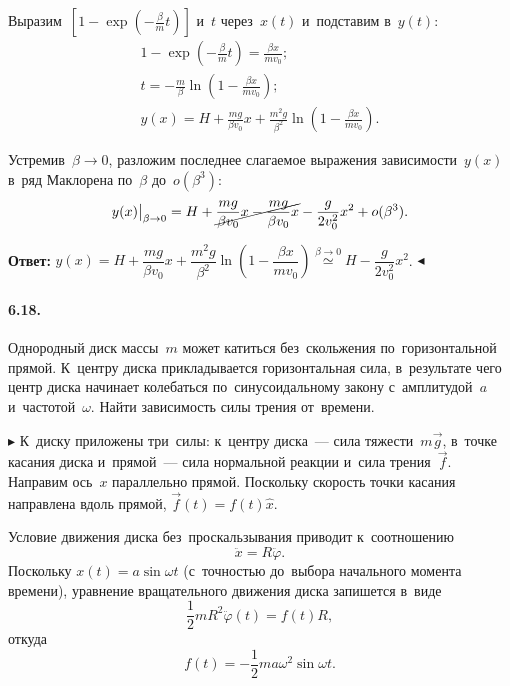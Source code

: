 \documentclass{weekly}
\begin{document}
Выразим~$\left[ 1 - \exp\left( -\frac{\beta}{m} t \right) \right]$
и~$t$ через~$x(t)$ и~подставим в~$y(t)$:
\begin{gather}
    1 - \exp\left( -\frac{\beta}{m} t \right)
        = \frac{\beta x}{m v_0}; \\
    t = -\frac{m}{\beta} \ln\left(1 - \frac{\beta x}{m v_0}\right); \\
    y(x) = H + \frac{mg}{\beta v_0} x +
            \frac{m^2 g}{\beta^2}
            \ln\left( 1 - \frac{\beta x}{m v_0}\right).
\end{gather}

Устремив~$\beta \to 0$, разложим последнее слагаемое
выражения зависимости~$y(x)$ в~ряд Маклорена по~$\beta$ до~$o(\beta^3)$:
\begin{equation}
    y(x)\big|_{\beta \to 0} = H + \cancel{\frac{mg}{\beta v_0} x -
            \frac{mg}{\beta v_0}x} - \frac{g}{2v_0^2}x^2 + o(\beta^3).
\end{equation}

\textbf{Ответ:}\quad
$y(x) = H + \dfrac{mg}{\beta v_0} x + \dfrac{m^2 g}{\beta^2}
\ln\left( 1 - \dfrac{\beta x}{m v_0}\right)
\stackrel{\beta \to 0}{\simeq} H - \dfrac{g}{2v_0^2}x^2$.
\hfill $\blacktriangleleft$


\paragraph{6.18.} Однородный диск массы~$m$ может катиться без~скольжения
по~горизонтальной прямой. К~центру диска прикладывается горизонтальная
сила, в~результате чего центр диска начинает колебаться
по~синусоидальному закону с~амплитудой~$a$ и~частотой~$\omega$.
Найти зависимость силы трения от~времени.

$\blacktriangleright$ К~диску приложены три~силы:
к~центру диска~--- сила тяжести~$m\vec g$,
в~точке касания диска и~прямой~--- сила нормальной реакции
и~сила трения~$\vec f$.
Направим ось~$x$ параллельно прямой. Поскольку скорость точки касания
направлена вдоль прямой, $\vec f(t) = f(t) \hat x$.

Условие движения диска без~проскальзывания приводит к~соотношению
\begin{equation}
    \ddot x = R \ddot\varphi.
\end{equation}
Поскольку $x(t) = a\sin\omega t$ (с~точностью до~выбора начального
момента времени), уравнение вращательного движения диска запишется в~виде
\begin{equation}
    \frac12 mR^2 \ddot\varphi(t) = f(t) R,
\end{equation}
откуда
\begin{equation}
    f(t) = -\frac12 ma\omega^2 \sin\omega t.
\end{equation}
\end{document}
